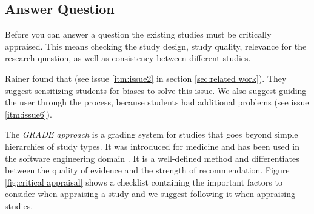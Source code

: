 
\subsection{Answer Question}
\label{subsec:answer question}

Before you can answer a question the existing studies must be critically appraised. This means checking the study design, study quality, relevance for the research question, as well as consistency between different studies. 

Rainer \etal found that  \cite{Rainer2006} (see issue \ref{itm:issue2} in section \ref{sec:related work}). They suggest sensitizing students for biases to solve this issue. We also suggest guiding the user through the process, because students had additional problems (see issue \ref{itm:issue6}). 

The \emph{GRADE approach} \cite{Atkins2004} is a grading system for studies that goes beyond simple hierarchies of study types. It was introduced for medicine and has been used in the software engineering domain \cite{Wohlin2013EvidenceProfile,Dyba2008}. It is a well-defined method and differentiates between the quality of evidence and the strength of recommendation. Figure \ref{fig:critical appraisal} shows a checklist containing the important factors to consider when appraising a study and we suggest following it when appraising studies. 

